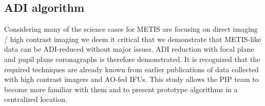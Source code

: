 \subsection{ADI algorithm}\label{ssec:criticaladialgorithm}
Considering many of the science cases for METIS are focusing on direct imaging / high contrast imaging we deem it critical that we demonstrate that METIS-like data can be ADI-reduced without major issues.
ADI reduction with focal plane and pupil plane coronagraphs is therefore demonstrated. %
It is recognized that the required techniques are already known from earlier publications of data collected with high contrast imagers and AO-fed IFUs.
This study allows the PIP team to become more familiar with them and to present prototype algorithms in a centralized location.

